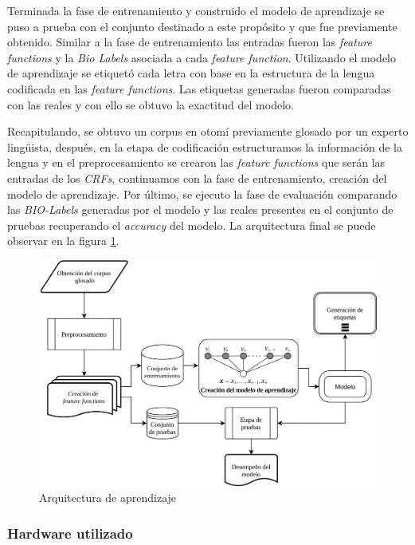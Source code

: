 \documentclass[letterpaper,12pt,oneside]{book}
\theoremstyle{definition}
\begin{document}
Terminada la fase de entrenamiento y construido el modelo de aprendizaje se puso a prueba con el conjunto destinado a este propósito y que fue previamente obtenido. Similar a la fase de entrenamiento las entradas fueron las \textit{feature functions} y la \textit{Bio Labels} asociada a cada \textit{feature function}. Utilizando el modelo de aprendizaje se etiquetó cada letra con base en la estructura de la lengua codificada en las \textit{feature functions}. Las etiquetas generadas fueron comparadas con las reales y con ello se obtuvo la exactitud del modelo. 

Recapitulando, se obtuvo un corpus en otomí previamente glosado por un experto lingüista, después, en la etapa de codificación estructuramos la información de la lengua y en el preprocesamiento se crearon las \textit{feature functions} que serán las entradas de los \textit{CRFs}, continuamos con la fase de entrenamiento, creación del modelo de aprendizaje. Por último, se ejecuto la fase de evaluación comparando las \textit{BIO-Labels} generadas por el modelo y las reales presentes en el conjunto de pruebas recuperando el \textit{accuracy} del modelo. La arquitectura final se puede observar en la figura \ref{fig:architecture}.

\begin{figure}[ht]
	\centering
	\includegraphics[width=\textwidth]{img/arquitectura}
	\caption{Arquitectura de aprendizaje}
	\label{fig:architecture}
\end{figure}

\subsubsection{Hardware utilizado}
\end{document}
